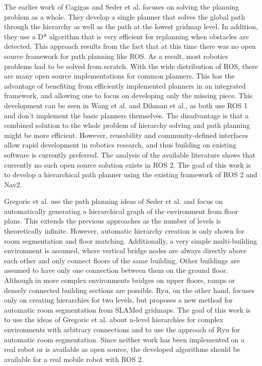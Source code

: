The earlier work of Cagigas and Seder et al. focuses on solving the planning problem as a whole. They develop a single planner that solves the global path through the hierarchy as well as the path at the lowest gridmap level. In addition, they use a D* algorithm that is very efficient for replanning when obstacles are detected. This approach results from the fact that at this time there was no open source framework for path planning like ROS. As a result, most robotics problems had to be solved from scratch. With the wide distribution of ROS, there are many open source implementations for common planners. This has the advantage of benefiting from efficiently implemented planners in an integrated framework, and allowing one to focus on developing only the missing piece. This development can be seen in Wang et al. and Dihman et al., as both use ROS 1 and don't implement the basic planners themselves. The disadvantage is that a combined solution to the whole problem of hierarchy solving and path planning might be more efficient. However, reusability and community-defined interfaces allow rapid development in robotics research, and thus building on existing software is currently preferred. The analysis of the available literature shows that currently no such open source solution exists in ROS 2. The goal of this work is to develop a hierarchical path planner using the existing framework of ROS 2 and Nav2.

Gregoric et al. use the path planning ideas of Seder et al. and focus on automatically generating a hierarchical graph of the environment from floor plans. This extends the previous approaches as the number of levels is theoretically infinite. However, automatic hierarchy creation is only shown for room segmentation and floor matching. Additionally, a very simple multi-building environment is assumed, where vertical bridge nodes are always directly above each other and only connect floors of the same building. Other buildings are assumed to have only one connection between them on the ground floor. Although in more complex environments bridges on upper floors, ramps or densely connected building sections are possible. Ryu, on the other hand, focuses only on creating hierarchies for two levels, but proposes a new method for automatic room segmentation from SLAMed gridmaps. The goal of this work is to use the ideas of Gregoric et al. about n-level hierarchies for complex environments with arbitrary connections and to use the approach of Ryu for automatic room segmentation. Since neither work has been implemented on a real robot or is available as open source, the developed algorithms should be available for a real mobile robot with ROS 2.

